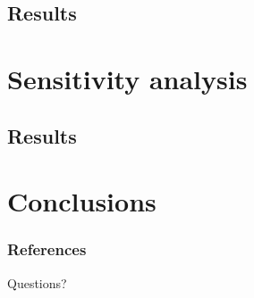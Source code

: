 \documentclass[9pt,xcolor={table}]{beamer}
\begin{document}
\subsection{Results}

\section{Sensitivity analysis}

\subsection{Results}

\section{Conclusions}




\begin{frame}[allowframebreaks]
    \frametitle{References}
    
    {\footnotesize  }
  
\end{frame}

\begin{frame}
  \large Questions?
\end{frame}


\end{document}

